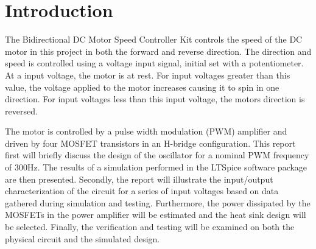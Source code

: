 \section{Introduction}

The Bidirectional DC Motor Speed Controller Kit controls the speed of the DC motor in this project in both the forward and reverse direction. 
The direction and speed is controlled using a voltage input signal, initial set with a potentiometer. 
At a  input voltage, the motor is at rest.
For input voltages greater than this value, the voltage applied to the motor increases causing it to spin in one direction.
For input voltages less than this  input voltage, the motors direction is reversed.

The motor is controlled by a pulse width modulation (PWM) amplifier and driven by four MOSFET transistors in an H-bridge configuration.
This report first will briefly discuss the design of the oscillator for a nominal PWM frequency of 300Hz.
The results of a simulation performed in the LTSpice software package are then presented.
Secondly, the report will illustrate the input/output characterization of the circuit for a series of input voltages based on data gathered during simulation and testing. 
Furthermore, the power dissipated by the MOSFETs in the power amplifier will be estimated and the heat sink design will be selected. 
Finally, the verification and testing will be examined on both the physical circuit and the simulated design.
